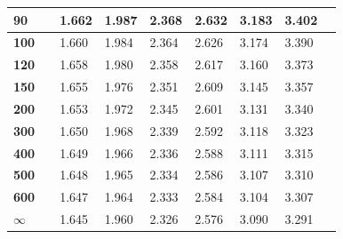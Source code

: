 \begin{alternateColorTable}
\begin{longtable}{|l|l l|l|l|l|l|l|l|}
    \textbf{90} & & 1.662 & 1.987 & 2.368 & 2.632 & 3.183 & 3.402\\ \hline
    
    \textbf{100} & & 1.660 & 1.984 & 2.364 & 2.626 & 3.174 & 3.390\\ \hline
    
    \textbf{120} & & 1.658 & 1.980 & 2.358 & 2.617 & 3.160 & 3.373\\ \hline
    
    \textbf{150} & & 1.655 & 1.976 & 2.351 & 2.609 & 3.145 & 3.357\\ \hline
    
    \textbf{200} & & 1.653 & 1.972 & 2.345 & 2.601 & 3.131 & 3.340\\ \hline
    
    \textbf{300} & & 1.650 & 1.968 & 2.339 & 2.592 & 3.118 & 3.323\\ \hline
    
    \textbf{400} & & 1.649 & 1.966 & 2.336 & 2.588 & 3.111 & 3.315\\ \hline
    
    \textbf{500} & & 1.648 & 1.965 & 2.334 & 2.586 & 3.107 & 3.310\\ \hline
    
    \textbf{600} & & 1.647 & 1.964 & 2.333 & 2.584 & 3.104 & 3.307\\ \hline
 
 $\infty$ & & 1.645 & 1.960 & 2.326 & 2.576 & 3.090 & 3.291 \\ \hline
\end{longtable}
\end{alternateColorTable}
\renewcommand{\arraystretch}{1}
\changefontsizes{11pt}

